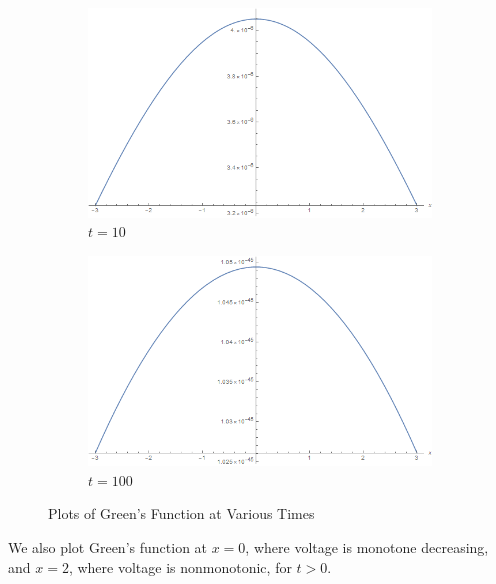 \documentclass[12pt]{article}
\begin{document}
\begin{figure}[H]
    \begin{subfigure}[h]{0.4\textwidth}
        \includegraphics[width=\textwidth]{Part1Plots/t10}
        \caption{$t=10$}
        \label{fig:t10}
    \end{subfigure}
    \begin{subfigure}[h]{0.4\textwidth}
        \includegraphics[width=\textwidth]{Part1Plots/t100}
        \caption{$t=100$}
        \label{fig:t100}
    \end{subfigure}
    \caption{Plots of Green's Function at Various Times}\label{fig:timeplots}
\end{figure}

We also plot Green's function at $x=0$, where voltage is monotone decreasing, and $x=2$, where voltage is nonmonotonic, for $t>0$.
\end{document}

